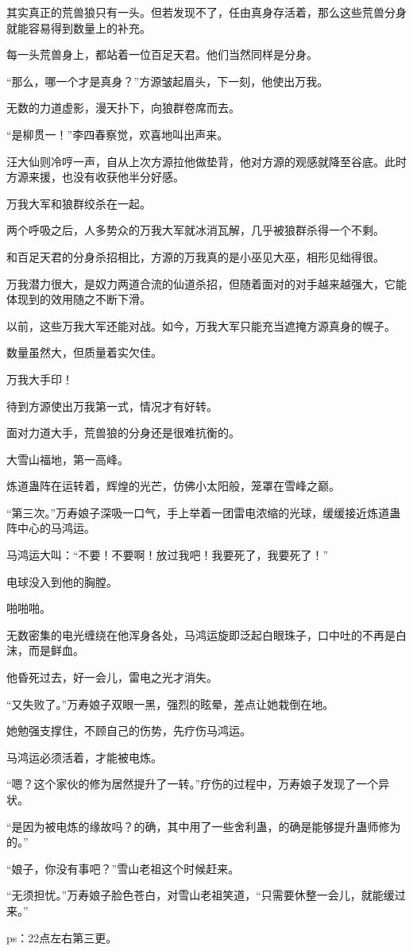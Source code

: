 \begin{this_body}
其实真正的荒兽狼只有一头。但若发现不了，任由真身存活着，那么这些荒兽分身就能容易得到数量上的补充。

每一头荒兽身上，都站着一位百足天君。他们当然同样是分身。

“那么，哪一个才是真身？”方源皱起眉头，下一刻，他使出万我。

无数的力道虚影，漫天扑下，向狼群卷席而去。

“是柳贯一！”李四春察觉，欢喜地叫出声来。

汪大仙则冷哼一声，自从上次方源拉他做垫背，他对方源的观感就降至谷底。此时方源来援，也没有收获他半分好感。

万我大军和狼群绞杀在一起。

两个呼吸之后，人多势众的万我大军就冰消瓦解，几乎被狼群杀得一个不剩。

和百足天君的分身杀招相比，方源的万我真的是小巫见大巫，相形见绌得很。

万我潜力很大，是奴力两道合流的仙道杀招，但随着面对的对手越来越强大，它能体现到的效用随之不断下滑。

以前，这些万我大军还能对战。如今，万我大军只能充当遮掩方源真身的幌子。

数量虽然大，但质量着实欠佳。

万我大手印！

待到方源使出万我第一式，情况才有好转。

面对力道大手，荒兽狼的分身还是很难抗衡的。

大雪山福地，第一高峰。

炼道蛊阵在运转着，辉煌的光芒，仿佛小太阳般，笼罩在雪峰之巅。

“第三次。”万寿娘子深吸一口气，手上举着一团雷电浓缩的光球，缓缓接近炼道蛊阵中心的马鸿运。

马鸿运大叫：“不要！不要啊！放过我吧！我要死了，我要死了！”

电球没入到他的胸膛。

啪啪啪。

无数密集的电光缠绕在他浑身各处，马鸿运旋即泛起白眼珠子，口中吐的不再是白沫，而是鲜血。

他昏死过去，好一会儿，雷电之光才消失。

“又失败了。”万寿娘子双眼一黑，强烈的眩晕，差点让她栽倒在地。

她勉强支撑住，不顾自己的伤势，先疗伤马鸿运。

马鸿运必须活着，才能被电炼。

“嗯？这个家伙的修为居然提升了一转。”疗伤的过程中，万寿娘子发现了一个异状。

“是因为被电炼的缘故吗？的确，其中用了一些舍利蛊，的确是能够提升蛊师修为的。”

“娘子，你没有事吧？”雪山老祖这个时候赶来。

“无须担忧。”万寿娘子脸色苍白，对雪山老祖笑道，“只需要休整一会儿，就能缓过来。”

ps：22点左右第三更。

\end{this_body}

